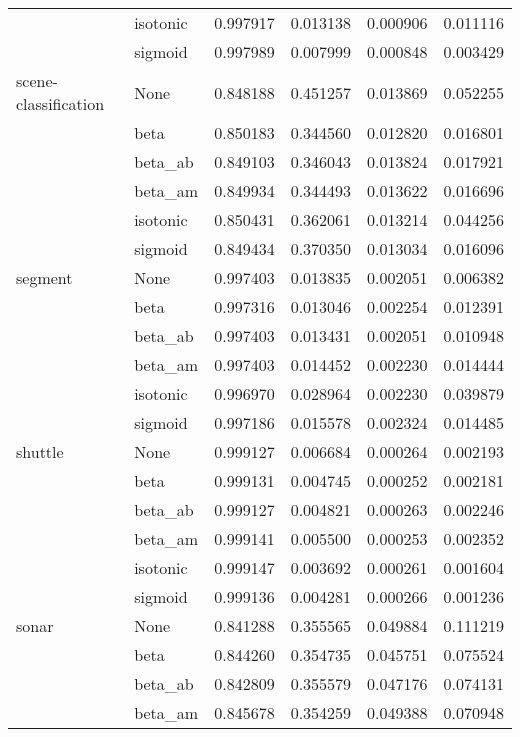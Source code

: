 \begin{tabular}{llrrrr}
        & isotonic &  0.997917 &  0.013138 &  0.000906 &  0.011116 \\
        & sigmoid &  0.997989 &  0.007999 &  0.000848 &  0.003429 \\
scene-classification & None &  0.848188 &  0.451257 &  0.013869 &  0.052255 \\
        & beta &  0.850183 &  0.344560 &  0.012820 &  0.016801 \\
        & beta\_ab &  0.849103 &  0.346043 &  0.013824 &  0.017921 \\
        & beta\_am &  0.849934 &  0.344493 &  0.013622 &  0.016696 \\
        & isotonic &  0.850431 &  0.362061 &  0.013214 &  0.044256 \\
        & sigmoid &  0.849434 &  0.370350 &  0.013034 &  0.016096 \\
segment & None &  0.997403 &  0.013835 &  0.002051 &  0.006382 \\
        & beta &  0.997316 &  0.013046 &  0.002254 &  0.012391 \\
        & beta\_ab &  0.997403 &  0.013431 &  0.002051 &  0.010948 \\
        & beta\_am &  0.997403 &  0.014452 &  0.002230 &  0.014444 \\
        & isotonic &  0.996970 &  0.028964 &  0.002230 &  0.039879 \\
        & sigmoid &  0.997186 &  0.015578 &  0.002324 &  0.014485 \\
shuttle & None &  0.999127 &  0.006684 &  0.000264 &  0.002193 \\
        & beta &  0.999131 &  0.004745 &  0.000252 &  0.002181 \\
        & beta\_ab &  0.999127 &  0.004821 &  0.000263 &  0.002246 \\
        & beta\_am &  0.999141 &  0.005500 &  0.000253 &  0.002352 \\
        & isotonic &  0.999147 &  0.003692 &  0.000261 &  0.001604 \\
        & sigmoid &  0.999136 &  0.004281 &  0.000266 &  0.001236 \\
sonar & None &  0.841288 &  0.355565 &  0.049884 &  0.111219 \\
        & beta &  0.844260 &  0.354735 &  0.045751 &  0.075524 \\
        & beta\_ab &  0.842809 &  0.355579 &  0.047176 &  0.074131 \\
        & beta\_am &  0.845678 &  0.354259 &  0.049388 &  0.070948 \\

\end{tabular}
